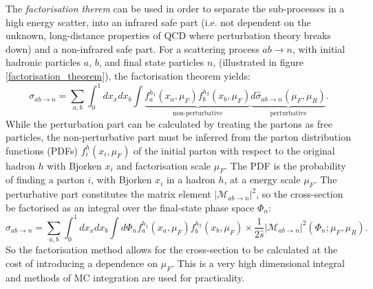 The \emph{factorisation therem} \cite{SM3} can be used in order to separate the sub-processes in a high energy scatter, into an infrared safe part (i.e. not dependent on the unknown, long-distance properties of QCD where perturbation theory breaks down) and a non-infrared safe part. For a scattering process $ab \longrightarrow n$, with initial hadronic particles $a$, $b$, and final state particles $n$, (illustrated in figure \ref{factorisation_theorem}), the factorisation theorem yields:
\begin{equation}
\sigma_{ab \rightarrow n} = \sum_{a,b}\int^{1}_{0}dx_{x}dx_{b}\int \underbrace{f_{a}^{h_{1}}(x_{a},\mu_{F})f_{b}^{h_{2}}(x_{b},\mu_{F})}_{\text{non-perturbative}}\underbrace{d\hat{\sigma}_{ab \rightarrow n}(\mu_{F},\mu_{R})}_{\text{perturbative}}.
\end{equation}
While the perturbation part can be calculated by treating the partons as free particles, the non-perturbative part must be inferred from the parton distribution functions (PDFs) $f_{i}^{h}(x_{i},\mu_{F})$ of the initial parton with respect to the original hadron $h$ with Bjorken $x_{i}$ and factorisation scale $\mu_{F}$. The PDF is the probability of finding a parton $i$, with Bjorken $x_{i}$ in a hadron $h$, at a energy scale $\mu_{F}$. The perturbative part constitutes the matrix element $| \mathcal{M}_{ab\rightarrow n} |^{2}$, so the cross-section be factorised as an integral over the final-state phase space $\Phi_{n}$:
\begin{equation}
\sigma_{ab \rightarrow n} = \sum_{a,b}\int^{1}_{0}dx_{x}dx_{b}\int d\Phi_{n} f_{a}^{h_{1}}(x_{a},\mu_{F})f_{b}^{h_{2}}(x_{b},\mu_{F}) \times \frac{1}{2\hat{s}}| \mathcal{M}_{ab\rightarrow n} |^{2} (\Phi _{n} ; \mu_{F},\mu_{R}).
\end{equation}
So the factorisation method allows for the cross-section to be calculated at the cost  of introducing a dependence on $\mu_{F}$. This is a very high dimensional integral and methods of MC integration are used for practicality.
